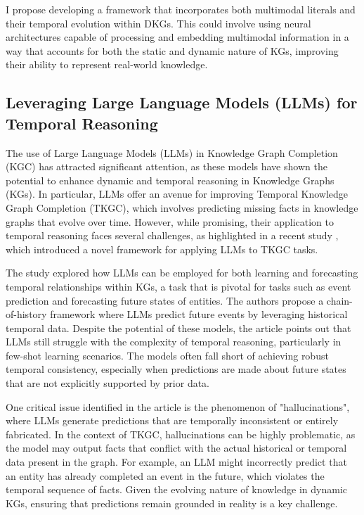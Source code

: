 I propose developing a framework that incorporates both multimodal literals and their temporal evolution within DKGs. This could involve using neural architectures capable of processing and 
embedding multimodal information in a way that accounts for both the static and dynamic nature of KGs, improving their ability to represent real-world knowledge.

\subsection{Leveraging Large Language Models (LLMs) for Temporal Reasoning}

The use of Large Language Models (LLMs) in Knowledge Graph Completion (KGC) has attracted significant attention, as these models have shown the potential to enhance dynamic and temporal
reasoning in Knowledge Graphs (KGs). In particular, LLMs offer an avenue for improving Temporal Knowledge Graph Completion (TKGC), which involves predicting missing facts in knowledge graphs
that evolve over time. However, while promising, their application to temporal reasoning faces several challenges, as highlighted in a recent study \cite{luo2024}, which introduced a novel 
framework for applying LLMs to TKGC tasks.

The study explored how LLMs can be employed for both learning and forecasting temporal relationships within KGs, a task that is pivotal for tasks such as event prediction and forecasting future
states of entities. The authors propose a chain-of-history framework where LLMs predict future events by leveraging historical temporal data. Despite the potential of these models, the article 
points out that LLMs still struggle with the complexity of temporal reasoning, particularly in few-shot learning scenarios. The models often fall short of achieving robust temporal consistency, 
especially when predictions are made about future states that are not explicitly supported by prior data.

One critical issue identified in the article is the phenomenon of "hallucinations", where LLMs generate predictions that are temporally inconsistent or entirely fabricated. In the context of 
TKGC, hallucinations can be highly problematic, as the model may output facts that conflict with the actual historical or temporal data present in the graph. For example, an LLM might 
incorrectly predict that an entity has already completed an event in the future, which violates the temporal sequence of facts. Given the evolving nature of knowledge in dynamic KGs, ensuring 
that predictions remain grounded in reality is a key challenge.

